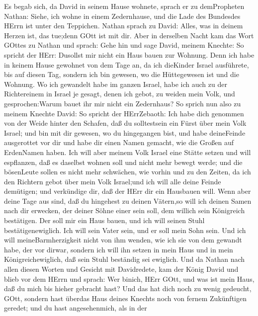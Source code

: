  Es begab sich, da David in seinem Hause wohnete, sprach er
zu demPropheten Nathan: Siehe, ich wohne in einem Zedernhause, und die
Lade des Bundesdes HErrn ist unter den Teppichen.  Nathan
sprach zu David: Alles, was in deinem Herzen ist, das tue;denn GOtt ist
mit dir.  Aber in derselben Nacht kam das Wort GOttes zu
Nathan und sprach:  Gehe hin und sage David, meinem Knechte:
So spricht der HErr: Dusollst mir nicht ein Haus bauen zur Wohnung.
 Denn ich habe in keinem Hause gewohnet von dem Tage an, da
ich dieKinder Israel ausführete, bis auf diesen Tag, sondern ich bin
gewesen, wo die Hüttegewesen ist und die Wohnung.  Wo ich
gewandelt habe im ganzen Israel, habe ich auch zu der Richtereinem in
Israel je gesagt, denen ich gebot, zu weiden mein Volk, und
gesprochen:Warum bauet ihr mir nicht ein Zedernhaus?  So
sprich nun also zu meinem Knechte David: So spricht der HErrZebaoth: Ich
habe dich genommen von der Weide hinter den Schafen, daß du solltestsein
ein Fürst über mein Volk Israel;  und bin mit dir gewesen,
wo du hingegangen bist, und habe deineFeinde ausgerottet vor dir und
habe dir einen Namen gemacht, wie die Großen auf ErdenNamen haben.
 Ich will aber meinem Volk Israel eine Stätte setzen und
will espflanzen, daß es daselbst wohnen soll und nicht mehr bewegt
werde; und die bösenLeute sollen es nicht mehr schwächen, wie vorhin
 und zu den Zeiten, da ich den Richtern gebot über mein
Volk Israel;und ich will alle deine Feinde demütigen; und verkündige
dir, daß der HErr dir ein Hausbauen will.  Wenn aber deine
Tage aus sind, daß du hingehest zu deinen Vätern,so will ich deinen
Samen nach dir erwecken, der deiner Söhne einer sein soll, dem willich
sein Königreich bestätigen.  Der soll mir ein Haus bauen,
und ich will seinen Stuhl bestätigenewiglich.  Ich will
sein Vater sein, und er soll mein Sohn sein. Und ich will
meineBarmherzigkeit nicht von ihm wenden, wie ich sie von dem gewandt
habe, der vor dirwar,  sondern ich will ihn setzen in mein
Haus und in mein Königreichewiglich, daß sein Stuhl beständig sei
ewiglich.  Und da Nathan nach allen diesen Worten und
Gesicht mit Davidredete,  kam der König David und blieb vor
dem HErrn und sprach: Wer binich, HErr GOtt, und was ist mein Haus, daß
du mich bis hieher gebracht hast?  Und das hat dich noch zu
wenig gedeucht, GOtt, sondern hast überdas Haus deines Knechts noch von
fernem Zukünftigen geredet; und du hast angesehenmich, als in der

